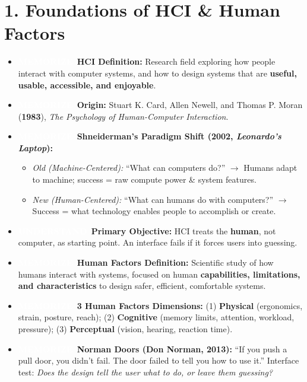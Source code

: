 \documentclass[8.5pt,a4paper,twocolumn]{article}
\newcommand{\tagmem}{\colorbox{accentred}{\textcolor{white}{\bfseries\fontsize{5.5pt}{6.5pt}\selectfont MEMORIZE}}\ }
\newcommand{\tagund}{\colorbox{themeblue}{\textcolor{white}{\bfseries\fontsize{5.5pt}{6.5pt}\selectfont UNDERSTAND}}\ }
\begin{document}
\section*{1. Foundations of HCI \& Human Factors}
\begin{itemize}[leftmargin=7pt, itemsep=1pt, topsep=0.5pt]
    \item \tagmem \textbf{HCI Definition:} Research field exploring how people interact with computer systems, and how to design systems that are \textbf{useful, usable, accessible, and enjoyable}.
    \item \tagmem \textbf{Origin:} Stuart K. Card, Allen Newell, and Thomas P. Moran (\textbf{1983}), \textit{The Psychology of Human-Computer Interaction}.
    \item \tagmem \textbf{Shneiderman's Paradigm Shift (2002, \textit{Leonardo's Laptop}):}
    \begin{itemize}[leftmargin=6pt, itemsep=0.5pt]
        \item \textit{Old (Machine-Centered):} ``What can computers do?'' $\rightarrow$ Humans adapt to machine; success = raw compute power \& system features.
        \item \textit{New (Human-Centered):} ``What can humans do with computers?'' $\rightarrow$ Success = what technology enables people to accomplish or create.
    \end{itemize}
    \item \tagund \textbf{Primary Objective:} HCI treats the \textbf{human}, not computer, as starting point. An interface fails if it forces users into guessing.
    \item \tagmem \textbf{Human Factors Definition:} Scientific study of how humans interact with systems, focused on human \textbf{capabilities, limitations, and characteristics} to design safer, efficient, comfortable systems.
    \item \tagmem \textbf{3 Human Factors Dimensions:} (1) \textbf{Physical} (ergonomics, strain, posture, reach); (2) \textbf{Cognitive} (memory limits, attention, workload, pressure); (3) \textbf{Perceptual} (vision, hearing, reaction time).
    \item \tagmem \textbf{Norman Doors (Don Norman, 2013):} ``If you push a pull door, you didn't fail. The door failed to tell you how to use it.'' Interface test: \textit{Does the design tell the user what to do, or leave them guessing?}
\end{itemize}
\end{document}
